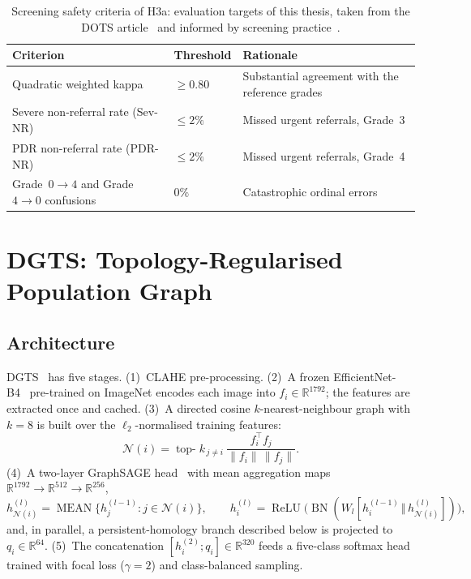 \begin{table}[!htbp]
\centering
\caption[Screening safety criteria of H3a]{Screening safety criteria of H3a: evaluation
targets of this thesis, taken from the DOTS article~\cite{belhadj2026dots} and informed by
screening practice~\cite{abramoff2018pivotal,scanlon2017english}.}
\label{tab:criteria}
\small
\begin{tabular}{@{}P{5.4cm}lP{6.0cm}@{}}
\toprule
Criterion & Threshold & Rationale \\
\midrule
Quadratic weighted kappa & $\geq0.80$ & Substantial agreement with the reference grades \\
Severe non-referral rate (Sev-NR) & $\leq2\%$ & Missed urgent referrals, Grade~3 \\
PDR non-referral rate (PDR-NR) & $\leq2\%$ & Missed urgent referrals, Grade~4 \\
Grade~$0\to4$ and Grade~$4\to0$ confusions & $0\%$ & Catastrophic ordinal errors \\
\bottomrule
\end{tabular}
\end{table}

\section{DGTS: Topology-Regularised Population Graph}
\label{sec:dgts}

\subsection{Architecture}

DGTS~\cite{belhadj2026dgts} has five stages. (1)~CLAHE pre-processing. (2)~A frozen
EfficientNet-B4~\cite{tan2019efficientnet} pre-trained on ImageNet encodes each image into
$f_i\in\mathbb{R}^{1792}$; the features are extracted once and cached. (3)~A directed
cosine $k$-nearest-neighbour graph with $k=8$ is built over the $\ell_2$-normalised
training features:
\begin{equation}
\mathcal{N}(i) = \operatorname*{top-}k_{\,j\neq i}\ \frac{f_i^{\top}f_j}{\lVert f_i\rVert\,\lVert f_j\rVert}.
\label{eq:dgts-knn}
\end{equation}
(4)~A two-layer GraphSAGE head~\cite{hamilton2017graphsage} with mean aggregation maps
$\mathbb{R}^{1792}\to\mathbb{R}^{512}\to\mathbb{R}^{256}$,
\begin{equation}
h_{\mathcal{N}(i)}^{(l)}=\operatorname{MEAN}\{h_j^{(l-1)}: j\in\mathcal{N}(i)\},\qquad
h_i^{(l)}=\operatorname{ReLU}\!\bigl(\operatorname{BN}(W_l[h_i^{(l-1)}\,\Vert\,h_{\mathcal{N}(i)}^{(l)}])\bigr),
\label{eq:dgts-sage}
\end{equation}
and, in parallel, a persistent-homology branch described below is projected to
$q_i\in\mathbb{R}^{64}$. (5)~The concatenation $[h_i^{(2)};q_i]\in\mathbb{R}^{320}$ feeds a
five-class softmax head trained with focal loss ($\gamma=2$) and class-balanced sampling.

